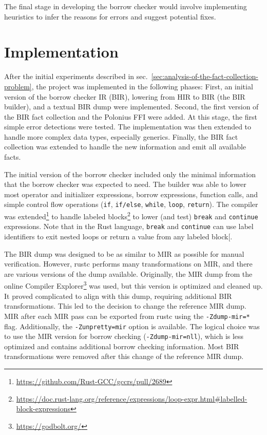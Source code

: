 \documentclass[
  11pt,
  twoside]{report}
\DeclareRobustCommand{\href}[2]{#2\footnote{\url{#1}}}
\begin{document}
The final stage in developing the borrow checker would involve
implementing heuristics to infer the reasons for errors and suggest
potential fixes.

\chapter{Implementation}\label{sec:implementation}

After the initial experiments described in
sec.~\ref{sec:analysis-of-the-fact-collection-problem}, the project was
implemented in the following phases: First, an initial version of the
borrow checker IR (BIR), lowering from HIR to BIR (the BIR builder), and
a textual BIR dump were implemented. Second, the first version of the
BIR fact collection and the Polonius FFI were added. At this stage, the
first simple error detections were tested. The implementation was then
extended to handle more complex data types, especially generics.
Finally, the BIR fact collection was extended to handle the new
information and emit all available facts.

The initial version of the borrow checker included only the minimal
information that the borrow checker was expected to need. The builder
was able to lower most operator and initializer expressions, borrow
expressions, function calls, and simple control flow operations
(\texttt{if}, \texttt{if/else}, \texttt{while}, \texttt{loop},
\texttt{return}). The compiler was
\href{https://github.com/Rust-GCC/gccrs/pull/2689}{extended} to handle
\href{https://doc.rust-lang.org/reference/expressions/loop-expr.html\#labelled-block-expressions}{labeled
blocks} to lower (and test) \texttt{break} and \texttt{continue}
expressions. Note that in the Rust language, \texttt{break} and
\texttt{continue} can use label identifiers to exit nested loops or
return a value from any labeled block{[}\citeproc{ref-reference}{14}{]}.

The BIR dump was designed to be as similar to MIR as possible for manual
verification. However, rustc performs many transformations on MIR, and
there are various versions of the dump available. Originally, the MIR
dump from the online \href{https://godbolt.org/}{Compiler Explorer} was
used, but this version is optimized and cleaned up. It proved
complicated to align with this dump, requiring additional BIR
transformations. This led to the decision to change the reference MIR
dump. MIR after each MIR pass can be exported from rustc using the
\texttt{-Zdump-mir=*} flag. Additionally, the \texttt{-Zunpretty=mir}
option is available. The logical choice was to use the MIR version for
borrow checking (\texttt{-Zdump-mir=nll}), which is less optimized and
contains additional borrow checking information. Most BIR
transformations were removed after this change of the reference MIR
dump.
\end{document}

